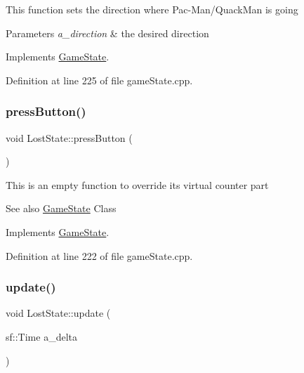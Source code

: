 This function sets the direction where Pac-\/\+Man/\+Quack\+Man is going


\begin{DoxyParams}{Parameters}
{\em a\+\_\+direction} & the desired direction \\
\hline
\end{DoxyParams}


Implements \hyperlink{class_game_state_aaae8c1b3ae6969eb2dd81bfc12fbf43f}{Game\+State}.



Definition at line 225 of file game\+State.\+cpp.

\mbox{\label{class_lost_state_ab0ec749961cfe909dc61289d14444a71}} 
\subsubsection{\texorpdfstring{press\+Button()}{pressButton()}}
{\footnotesize\ttfamily void Lost\+State\+::press\+Button (\begin{DoxyParamCaption}{ }\end{DoxyParamCaption})\hspace{0.3cm}{\ttfamily [virtual]}}

This is an empty function to override it\textquotesingle{}s virtual counter part \begin{DoxySeeAlso}{See also}
\hyperlink{class_game_state}{Game\+State} Class 
\end{DoxySeeAlso}


Implements \hyperlink{class_game_state_aa14eeaf244bcf19b7013af75cb722dde}{Game\+State}.



Definition at line 222 of file game\+State.\+cpp.

\mbox{\label{class_lost_state_a16d5e12284d03f8dd6b25a897b25839b}} 
\subsubsection{\texorpdfstring{update()}{update()}}
{\footnotesize\ttfamily void Lost\+State\+::update (\begin{DoxyParamCaption}\item[{sf\+::\+Time}]{a\+\_\+delta }\end{DoxyParamCaption})\hspace{0.3cm}{\ttfamily [virtual]}}

